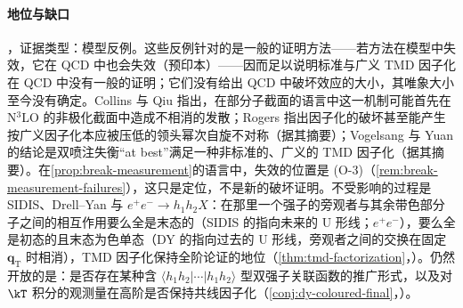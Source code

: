 \paragraph{地位与缺口}\tagV，证据类型：模型反例。这些反例针对的是一般的证明方法——若方法在模型中失效，它在 QCD 中也会失效\cite{Collins2007}（预印本）——因而足以说明标准与广义 TMD 因子化在 QCD 中没有一般的证明；它们没有给出 QCD 中破坏效应的大小，其唯象大小至今没有确定。Collins 与 Qiu 指出，在部分子截面的语言中这一机制可能首先在 N$^3$LO 的非极化截面中造成不相消的发散\cite{CollinsQiu2007}；Rogers 指出因子化的破坏甚至能产生按广义因子化本应被压低的领头幂次自旋不对称\cite{Rogers:2013zha}（据其摘要）；Vogelsang 与 Yuan 的结论是双喷注失衡“at best”满足一种非标准的、广义的 TMD 因子化\cite{Vogelsang:2007jk}（据其摘要）。在\cref{prop:break-measurement}的语言中，失效的位置是 (O-3)（\cref{rem:break-measurement-failures}），这只是定位，不是新的破坏证明。不受影响的过程是 SIDIS、Drell--Yan 与 $e^+e^-\to h_1h_2X$：在那里一个强子的旁观者与其余带色部分子之间的相互作用要么全是末态的（SIDIS 的指向未来的 U 形线；$e^+e^-$），要么全是初态的且末态为色单态（DY 的指向过去的 U 形线，旁观者之间的交换在固定 $\boldsymbol q_{\mathrm T}$ 时相消），TMD 因子化保持全阶论证的地位（\cref{thm:tmd-factorization}，\tagA）。仍然开放的是：是否存在某种含 $\langle h_1h_2|\cdots|h_1h_2\rangle$ 型双强子关联函数的推广形式，以及对 $\kT$ 积分的观测量在高阶是否保持共线因子化（\cref{conj:dy-coloured-final}，\tagC）。

